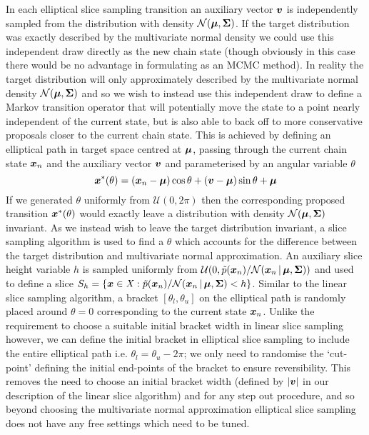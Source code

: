 In each elliptical slice sampling transition an auxiliary vector $\boldsymbol{v}$ is independently sampled from the distribution with density $\nrm{\vct{\mu},\mtx{\Sigma}}$. If the target distribution was exactly described by the multivariate normal density we could use this independent draw directly as the new chain state (though obviously in this case there would be no advantage in formulating as an \ac{MCMC} method). In reality the target distribution will only approximately described by the multivariate normal density $\nrm{\vct{\mu},\mtx{\Sigma}}$ and so we wish to instead use this independent draw to define a Markov transition operator that will potentially move the state to a point nearly independent of the current state, but is also able to back off to more conservative proposals closer to the current chain state. This is achieved by defining an elliptical path in target space centred at $\boldsymbol{\mu}$, passing through the current chain state $\boldsymbol{x}_n$ and the auxiliary vector $\boldsymbol{v}$ and parameterised by an angular variable $\theta$
\begin{equation}\label{eq:elliptical-path}
  \boldsymbol{x}^*(\theta) = (\boldsymbol{x}_n - \boldsymbol{\mu}) \cos\theta + (\boldsymbol{v} - \boldsymbol{\mu}) \sin\theta + \boldsymbol{\mu}
\end{equation}
If we generated $\theta$ uniformly from $\mathcal{U}(0,2\pi)$ then the corresponding proposed transition $\boldsymbol{x}^*(\theta)$ would exactly leave a distribution with density $\nrm{\vct{\mu},\mtx{\Sigma}}$ invariant. As we instead wish to leave the target distribution invariant, a slice sampling algorithm is used to find a $\theta$  which accounts for the difference between the target distribution and multivariate normal approximation. An auxiliary slice height variable $h$ is sampled uniformly from $\mathcal{U}\lpa 0,\utgtdens(\vct{x}_n) / \nrm{\vct{x}_n \gvn \vct{\mu}, \mtx{\Sigma}}\rpa$ and used to define a slice $S_h = \lbr \vct{x} \in \set{X} : \utgtdens(\vct{x}_n) / \nrm{\vct{x}_n \gvn \vct{\mu}, \mtx{\Sigma}} < h \rbr$. Similar to the linear slice sampling algorithm, a bracket $[\theta_l, \theta_u]$ on the elliptical path is randomly placed around $\theta = 0$ corresponding to the current state $\boldsymbol{x}_n$. Unlike the requirement to choose a suitable initial bracket width in linear slice sampling however, we can define the initial bracket in elliptical slice sampling to include the entire elliptical path i.e. $\theta_l = \theta_u - 2\pi$; we only need to randomise the `cut-point' defining the initial end-points of the bracket to ensure reversibility. This removes the need to choose an initial bracket width (defined by $|\boldsymbol{v}|$ in our description of the linear slice algorithm) and for any step out procedure, and so beyond choosing the multivariate normal approximation elliptical slice sampling does not have any free settings which need to be tuned.

